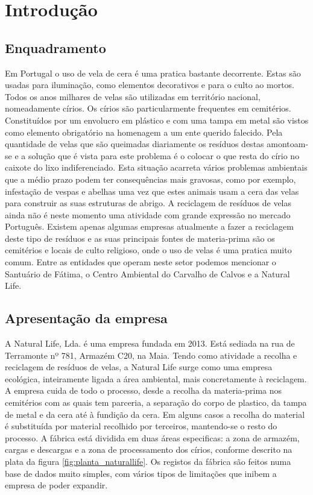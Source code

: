 \chapter{Introdução}
\label{cap:1}

\section{Enquadramento}
Em Portugal o uso de vela de cera é uma pratica bastante decorrente. Estas são usadas para iluminação, como elementos decorativos e para o culto ao mortos. Todos os anos milhares de velas são utilizadas em território nacional, nomeadamente círios. Os círios são particularmente frequentes em cemitérios. Constituídos por um envolucro em plástico e com uma tampa em metal são vistos como elemento obrigatório na homenagem a um ente querido falecido. Pela quantidade de velas que são queimadas diariamente os resíduos destas amontoam-se e a solução que é vista para este problema é o colocar o que resta do círio no caixote do lixo indiferenciado. Esta situação acarreta vários problemas ambientais que a médio prazo podem ter consequências mais gravosas, como por exemplo, infestação de vespas e abelhas uma vez que estes animais usam a cera das velas para construir as suas estruturas de abrigo.
A reciclagem de resíduos de velas ainda não é neste momento uma atividade com grande expressão no mercado Português. Existem apenas algumas empresas atualmente a fazer a reciclagem deste tipo de resíduos e as suas principais fontes de materia-prima são os cemitérios e locais de culto religioso, onde o uso de velas é uma pratica muito comum. Entre as entidades que operam neste setor podemos mencionar o Santuário de Fátima\cite{Destak2010}, o Centro Ambiental do Carvalho de Calvos\cite{SecundinoCunha2016} e a Natural Life\cite{NaturalLife}.

\section{Apresentação da empresa}
A Natural Life, Lda. é uma empresa fundada em 2013. Está sediada na rua de Terramonte nº 781, Armazém C20, na Maia. Tendo como atividade a recolha e reciclagem de resíduos de velas, a Natural Life surge como uma empresa ecológica, inteiramente ligada a área ambiental, mais concretamente à reciclagem\cite{NaturalLife}. A empresa cuida de todo o processo, desde a recolha da materia-prima nos cemitérios com as quais tem parceria, a separação do corpo de plastico, da tampa de metal e da cera até à fundição da cera. Em alguns casos a recolha do material é substituída por material recolhido por terceiros, mantendo-se o resto do processo. A fábrica está dividida em duas áreas especificas: a zona de armazém, cargas e descargas e a zona de processamento dos círios, conforme descrito na plata da figura \ref{fig:planta_naturallife}. Os registos da fábrica são feitos numa base de dados muito simples, com vários tipos de limitações que inibem a empresa de poder expandir.

